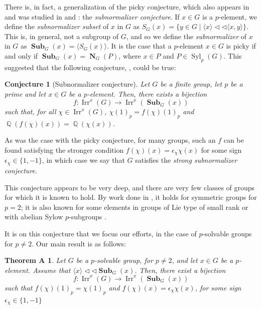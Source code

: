\documentclass[12pt]{amsart}
\DeclareMathOperator{\Q}{\mathbb{Q}}
\DeclareMathOperator{\NB}{\mathbf{N}}
\DeclareMathOperator{\Syl}{Syl}
\DeclareMathOperator{\Sub}{\mathbf{Sub}}
\DeclareMathOperator{\Irr}{Irr}
\theoremstyle{remark}
\theoremstyle{definition}
\theoremstyle{plain}
\newtheorem*{conUn}{Conjecture}
\newtheorem*{thmA}{Theorem A}
\theoremstyle{definition}
\numberwithin{equation}{section}
\begin{document}
There is, in fact, a generalization of the picky conjecture, which also appears in \cite{Mor} and was studied in \cite{GunterSubnormalizer} and \cite{SymmetricPicky}: the \emph{subnormalizer conjecture}. If $x \in G$ is a $p$-element, we define the \emph{subnormalizer subset} of $x$ in $G$ as $S_G(x) = \{y \in G \mid \langle x \rangle {\triangleleft}{\triangleleft} \langle x, y \rangle\}$. This is, in general, not a subgroup of $G$, and so we define the \emph{subnormalizer} of $x$ in $G$ as $\Sub_G(x) = \langle S_G(x) \rangle$. It is the case that a $p$-element $x \in G$ is picky if and only if $\Sub_G(x) = \NB_G(P)$, where $x \in P$ and $P \in \Syl_p(G)$. This suggested that the following conjecture, \cite[Conjecture B]{Mor}, could be true:
\begin{conUn}[Subnormalizer conjecture]
	Let $G$ be a finite group, let $p$ be a prime and let $x \in G$ be a $p$-element. Then, there exists a bijection
	\begin{equation*}
		f: \Irr^x(G) \to \Irr^x(\Sub_G(x))
	\end{equation*}
	such that, for all $\chi \in \Irr^x(G)$, $\chi(1)_p = f(\chi)(1)_p$ and $\Q(f(\chi)(x)) = \Q(\chi(x))$.
\end{conUn}
As was the case with the picky conjecture, for many groups, such an $f$ can be found satisfying the stronger condition $f(\chi)(x) = \epsilon_\chi \chi(x)$ for some sign $\epsilon_{\chi} \in \{1, -1\}$, in which case we say that $G$ satisfies the \emph{strong subnormalizer conjecture}. 

This conjecture appears to be very deep, and there are very few classes of groups for which it is known to hold. By work done in \cite{SymmetricPicky}, it holds for symmetric groups for $p = 2$; it is also known for some elements in groups of Lie type of small rank \cite{GunterSubnormalizer} or with abelian Sylow $p$-subgroups \cite{GunterAbelianSylow}. 

It is on this conjecture that we focus our efforts, in the case of $p$-solvable groups for $p \neq 2$. Our main result is as follows:

\begin{thmA}
	Let $G$ be a $p$-solvable group, for $p \neq 2$, and let $x \in G$ be a $p$-element. Assume that $\langle x \rangle {\triangleleft}{\triangleleft} \Sub_G(x)$. Then, there exist a bijection
	\begin{equation*}
		f : \Irr^x(G) \to \Irr^x(\Sub_G(x))
	\end{equation*}
	such that $f(\chi)(1)_p = \chi(1)_p$ and $f(\chi)(x) = \epsilon_\chi \chi(x)$, for some sign $\epsilon_\chi \in \{1, -1\}$ 
\end{thmA}
\end{document}
